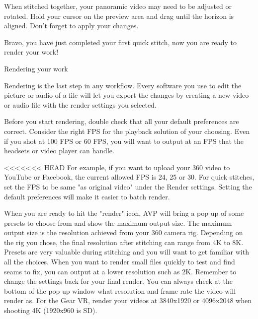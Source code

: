 \begin{fullwidth}

When stitched together, your panoramic video may need to be adjusted or rotated. Hold your cursor on the preview area and drag until the horizon is aligned. Don't forget to apply your changes.


Bravo, you have just completed your first quick stitch, now you are ready to render your work!

{\large Rendering your work \par}

Rendering is the last step in any workflow. Every software you use to edit the picture or audio of a file will let you export the changes by creating a new video or audio file with the render settings you selected.

Before you start rendering, double check that all your default preferences are correct. Consider the right FPS for the playback solution of your choosing. Even if you shot at 100 FPS or 60 FPS, you will want to output at an FPS that the headsets or video player can handle. 

<<<<<<< HEAD
For example, if you want to upload your 360 video to YouTube or Facebook, the current allowed FPS is 24, 25 or 30. For quick stitches, set the FPS to be same "as original video" under the Render settings. Setting the default preferences will make it easier to batch render.


When you are ready to hit the "render" icon, AVP will bring a pop up of some presets to choose from and show the maximum output size. The maximum output size is the resolution achieved from your 360 camera rig. Depending on the rig you chose, the final resolution after stitching can range from 4K to 8K. Presets are very valuable during stitching and you will want to get familiar with all the choices. When you want to render small files quickly to test and find seams to fix, you can output at a lower resolution such as 2K. Remember to change the settings back for your final render. You can always check at the bottom of the pop up window what resolution and frame rate the video will render as. For the Gear VR, render your videos at 3840x1920 or 4096x2048 when shooting 4K (1920x960 is SD).


\end{fullwidth}
